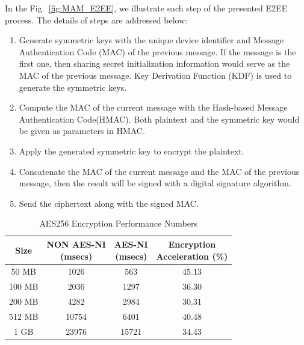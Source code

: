 \begin{spacing}{2.0}
In the Fig.~\ref{fig:MAM_E2EE}, we illustrate each step of the presented E2EE process. The details of steps are addressed below:

\begin{enumerate}
    \item Generate symmetric keys with the unique device identifier and Message Authentication Code (MAC) of the previous message. If the message is the first one, then sharing secret initialization information would serve as the MAC of the previous message. Key Derivation Function (KDF) is used to generate the symmetric keys.
    \item Compute the MAC of the current message with the Hash-based Message Authentication Code(HMAC). Both plaintext and the symmetric key would be given as parameters in HMAC.
    \item Apply the generated symmetric key to encrypt the plaintext.
    \item Concatenate the MAC of the current message and the MAC of the previous message, then the result will be signed with a digital signature algorithm.
    \item Send the ciphertext along with the signed MAC.
\end{enumerate}

\begin{table}[htbp]
    \caption{AES256 Encryption Performance Numbers}
    \label{tab:AES_NI}
    \begin{center}
        \begin{tabular}{ |c||c|c|c|  }
            \hline
            Size& \makecell{NON AES-NI \\ (msecs)} & \makecell{AES-NI \\ (msecs)} & \makecell{Encryption \\ Acceleration (\%)} \\
            \hline
            50 MB  & 1026  & 563   & 45.13 \\
            100 MB & 2036  & 1297  & 36.30 \\
            200 MB & 4282  & 2984  & 30.31 \\
            512 MB & 10754 & 6401  & 40.48 \\
            1 GB   & 23976 & 15721 & 34.43 \\
            \hline
        \end{tabular}
    \end{center}
\end{table}


\end{spacing}

